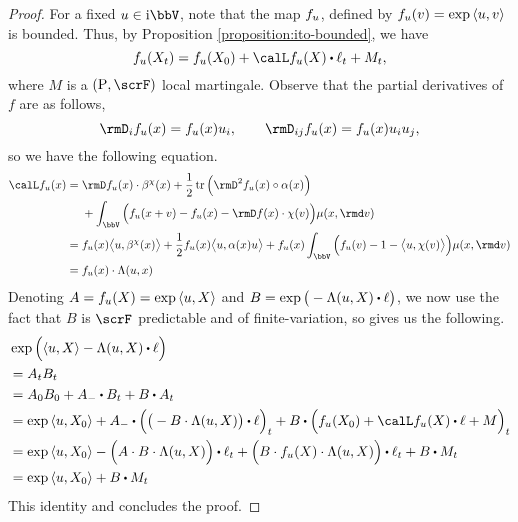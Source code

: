 \begin{proof}
  \label{proof:proposition:LK}
  For a fixed $\momentVar \in \im\vecSpace$, note that the map $f_u$, defined by $f_u(v) = \exp{\langle u, v\rangle}$ is bounded.
  Thus, by Proposition \ref{proposition:ito-bounded}, we have 
  \[
    f_\momentVar(\X_t) = f_\momentVar(\X_0) +  \generator f_\momentVar(\X) \shortInt \leb_t + M_t,
  \]
  where $M$ is a $(\Prb, \scrF)$ local martingale.
  Observe that the partial derivatives of $f$ are as follows,
  \begin{equation}
    \label{eq:exponential-derivatives}
    \Der_i f_\momentVar(\stateVar) = f_\momentVar(\stateVar) \momentVar_i, \qquad \Der_{ij} f_\momentVar(\stateVar) = f_\momentVar(\stateVar) \momentVar_i\momentVar_j,
  \end{equation}
  so we have the following equation.
  \begin{align*}
    \generator f_\momentVar(\stateVar)
    &=\begin{aligned}[t]
      &\Der f_\momentVar(\stateVar) \cdot \affDrift^\trunc(\stateVar) + \frac12 \tr\Big( \Hess f_\momentVar(\stateVar) \circ \affDiff(\stateVar) \Big) \\
      &+ \int_\vecSpace \Big( f_\momentVar(\stateVar + \markVar) - f_\momentVar(\stateVar) - \Der f(\stateVar) \cdot \trunc(\markVar) \Big) \affJump(\stateVar, \rmd\markVar)
    \end{aligned} \\
    &= f_\momentVar(\stateVar) \bprj{\momentVar}{\affDrift^\trunc(\stateVar)} + \frac12 f_\momentVar(\stateVar) \bprj{\momentVar}{\affDiff(\stateVar)\momentVar} +  f_\momentVar(\stateVar) \int_\vecSpace \Big( f_\momentVar(\markVar) - 1 - \bprj{\momentVar}{\trunc(\markVar)} \Big) \affJump(\stateVar, \rmd\markVar) \\
    &= f_\momentVar(\stateVar) \cdot \ode(\momentVar, \stateVar)
  \end{align*}
  Denoting $A = f_u(X) = \exp{\langle u, X\rangle}$ and $B = \exp\big(-\ode(\momentVar, \X) \shortInt \leb\big)$, we now use the fact that $B$ is $\scrF$ predictable and of finite-variation, so \cite[Proposition I.4.49(b)]{jacod2003} gives us the following.
  \begin{align*}
    &\exp\Big(\prj{\momentVar}{\X} - \ode(\momentVar, \X) \shortInt \leb \Big) \\
    &= A_t B_t \\
    &= A_0 B_0 + A_- \shortInt B_t + B \shortInt A_t \\
    &= \exp\prj{\momentVar}{\X_0} + A_- \shortInt \Big(\big( -B \cdot \ode(\momentVar, \X) \big)\shortInt \leb \Big)_t  + B \shortInt \Big( f_\momentVar(\X_0) + \generator f_\momentVar(\X) \shortInt \leb + M \Big)_t \\
    &= \exp\prj{\momentVar}{\X_0} - \Big( A \cdot B \cdot \ode(\momentVar, \X) \Big) \shortInt \leb_t + \Big( B \cdot f_\momentVar(\X) \cdot \ode(\momentVar, \X) \Big) \shortInt \leb_t + B \shortInt M_t \\
    &= \exp\prj{\momentVar}{\X_0} + B\shortInt M_t
  \end{align*}
  This identity and \cite[Remark I.4.34(b)]{jacod2003} concludes the proof.
\end{proof}

